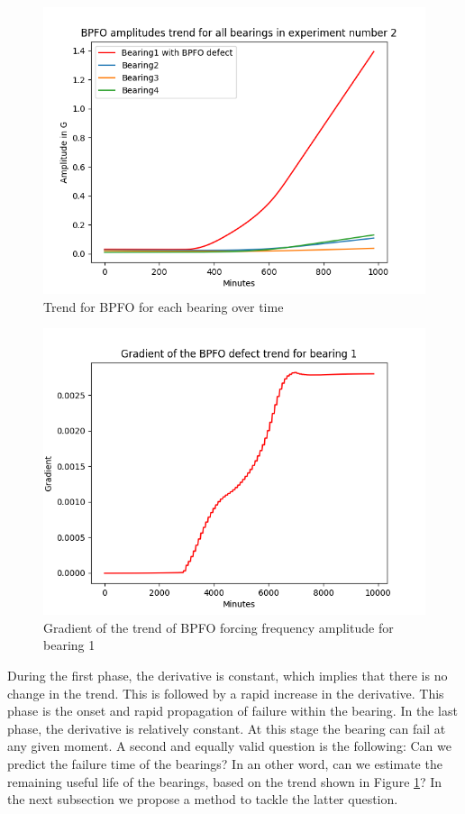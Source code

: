 \documentclass[../Main/thesis.tex]{subfiles}
\begin{document}
\begin{figure}[H] 
   \centering
   \includegraphics[width=4.9in]{../fig/experiment2_bearing_fft_trend.png} 
   \caption{Trend for BPFO for each bearing over time}
   \label{fig:experiment2_bearing_fft_trend}
\end{figure}
\begin{figure}[H] %
   \centering
   \includegraphics[width=4.9in]{../fig/bearing1_bpfo_trend_grad.png} 
   \caption{Gradient of the trend of BPFO forcing frequency amplitude for bearing 1}
   \label{fig:grad_trend}
\end{figure}
\clearpage
\justify
During the first phase, the derivative is constant, which implies that there is no change in the trend. This is followed by a rapid increase in the derivative. This phase is the onset and rapid propagation of failure within the bearing. In the last phase, the derivative is relatively constant. At this stage the bearing can fail at any given moment. A second and equally valid question is the following: Can we predict the failure time of the bearings? In an other word, can we estimate the remaining useful life of the bearings, based on the trend shown in Figure \ref{fig:experiment2_bearing_fft_trend}? In the next subsection we propose a method to tackle the latter question.
\end{document}
